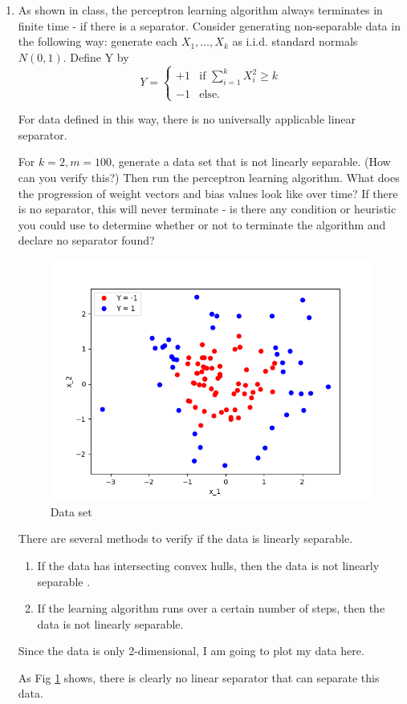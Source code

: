 \documentclass[letter, 12pt]{article}
\begin{document}
\begin{enumerate}
        \item {As shown in class, the perceptron learning algorithm always terminates in finite time - if there is a separator.
            Consider generating non-separable data in the following way: generate each $ X_1 , \dots , X_k $ as i.i.d. standard
            normals $ N (0, 1) $. Define Y by \[ Y = \begin{cases}
            +1 & \text{if } \sum_{i=1}^{k}X_i^2 \ge k \\
            -1 & \text{else}.
            \end{cases} \]}
        \par{For data defined in this way, there is no universally applicable linear separator.}
        \par{For $ k = 2, m = 100 $, generate a data set that is not linearly separable. (How can you verify this?) Then run
            the perceptron learning algorithm. What does the progression of weight vectors and bias values look like over
            time? If there is no separator, this will never terminate - is there any condition or heuristic you could use to
            determine whether or not to terminate the algorithm and declare no separator found?}
        \begin{figure}[H]
	        \centering
	        \includegraphics[width=.7\textwidth]{q5.png}
	        \caption{Data set}
	        \label{q5}
	    \end{figure}
    	\par{There are several methods to verify if the data is linearly separable.}
    	\begin{enumerate}
    		\item{If the data has intersecting convex hulls, then the data is not linearly separable \cite{holmes}. }
    		\item{If the learning algorithm runs over a certain number of steps, then the data is not linearly separable.}
    	\end{enumerate}
   		\par{Since the data is only 2-dimensional, I am going to plot my data here.}
    	\par{As Fig \ref{q5} shows, there is clearly no linear separator that can separate this data. }
    \end{enumerate}

	{}
	
\end{document}
